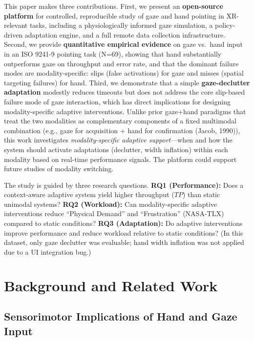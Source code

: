 \documentclass[
  11pt,
  11pt,
  letterpaper]{article}
\begin{document}
This paper makes three contributions. First, we present an
\textbf{open-source platform} for controlled, reproducible study of gaze
and hand pointing in XR-relevant tasks, including a physiologically
informed gaze simulation, a policy-driven adaptation engine, and a full
remote data collection infrastructure. Second, we provide
\textbf{quantitative empirical evidence} on gaze vs.~hand input in an
ISO 9241-9 pointing task (N=69), showing that hand substantially
outperforms gaze on throughput and error rate, and that the dominant
failure modes are modality-specific: slips (false activations) for gaze
and misses (spatial targeting failures) for hand. Third, we demonstrate
that a simple \textbf{gaze-declutter adaptation} modestly reduces
timeouts but does not address the core slip-based failure mode of gaze
interaction, which has direct implications for designing
modality-specific adaptive interventions. Unlike prior gaze+hand
paradigms that treat the two modalities as complementary components of a
fixed multimodal combination (e.g., gaze for acquisition + hand for
confirmation (Jacob, 1990)), this work investigates
\emph{modality-specific adaptive support}---when and how the system
should activate adaptations (declutter, width inflation) within each
modality based on real-time performance signals. The platform could
support future studies of modality switching.

The study is guided by three research questions. \textbf{RQ1
(Performance):} Does a context-aware adaptive system yield higher
throughput (\(TP\)) than static unimodal systems? \textbf{RQ2
(Workload):} Can modality-specific adaptive interventions reduce
``Physical Demand'' and ``Frustration'' (NASA-TLX) compared to static
conditions? \textbf{RQ3 (Adaptation):} Do adaptive interventions improve
performance and reduce workload relative to static conditions? (In this
dataset, only gaze declutter was evaluable; hand width inflation was not
applied due to a UI integration bug.)

\section{Background and Related Work}\label{background-and-related-work}

\subsection{Sensorimotor Implications of Hand and Gaze
Input}\label{sensorimotor-implications-of-hand-and-gaze-input}
\end{document}
